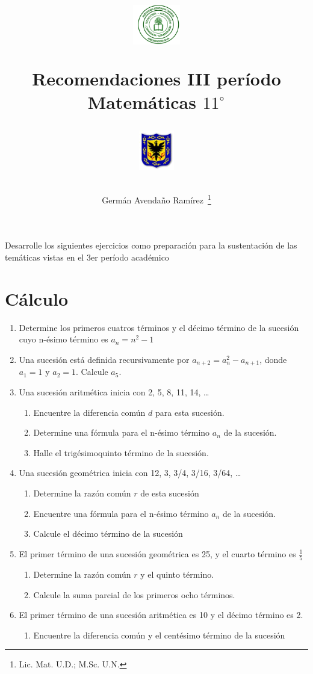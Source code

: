 \documentclass[letterpaper,twoside]{article}
\date{}
\author{Germán Avendaño Ramírez~\thanks{Lic. Mat. U.D.; M.Sc. U.N.}}
\title{\begin{minipage}{.2\textwidth}
\includegraphics[height=1.75cm]{Images/logo-colegio.png}
\end{minipage}
\begin{minipage}{.55\textwidth}
\begin{center}
Recomendaciones III período \\
Matemáticas $11^{\circ}$
\end{center}
\end{minipage}\hfill
\begin{minipage}{.2\textwidth}
\includegraphics[height=1.75cm]{Images/logo-sed.png} 
\end{minipage}}
\begin{document}
\maketitle
Desarrolle los siguientes ejercicios como preparación para la sustentación de las temáticas vistas en el 3er período académico
\section{Cálculo}
\begin{enumerate}
\item Determine los primeros cuatros términos y el décimo término de la sucesión cuyo n-ésimo término es $a_{n}=n^{2}-1$
\item Una sucesión está definida recursivamente por $a_{n+2}=a_{n}^{2}-a_{n+1}$, donde $a_{1}=1$ y $a_{2}=1$. Calcule $a_{5}$.
\item Una sucesión aritmética inicia con 2, 5, 8, 11, 14, \ldots
\begin{enumerate}
\item Encuentre la diferencia común $d$ para esta sucesión.
\item Determine una fórmula para el n-ésimo término $a_{n}$ de la sucesión.
\item Halle el trigésimoquinto término de la sucesión.
\end{enumerate}
\item Una sucesión geométrica inicia con 12, 3, 3/4, 3/16, 3/64, \ldots
\begin{enumerate}
\item Determine la razón común $r$ de esta sucesión
\item Encuentre una fórmula para el n-ésimo término $a_{n}$ de la sucesión.
\item Calcule el décimo término de la sucesión
\end{enumerate}
\item El primer término de una sucesión geométrica es 25, y el cuarto término es $\frac{1}{5}$
\begin{enumerate}
\item Determine la razón común $r$ y el quinto término.
\item Calcule la suma parcial de los primeros ocho términos.
\end{enumerate}
\item El primer término de una sucesión aritmética es 10 y el décimo término es 2.
\begin{enumerate}
\item Encuentre la diferencia común y el centésimo término de la sucesión

\end{enumerate}
\end{enumerate}
\end{document}
